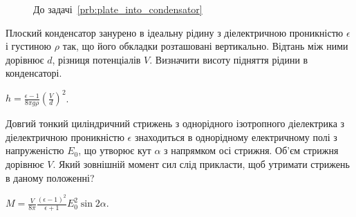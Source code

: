 \begin{figure}[h!]\centering
\caption{До задачі~\ref{prb:plate_into_condensator}}
\label{plate_into_condensator}
\end{figure}




\begin{problem}%
Плоский конденсатор занурено в ідеальну рідину з діелектричною проникністю $\epsilon$ і густиною $\rho$ так, що його обкладки розташовані вертикально. Відтань між ними дорівнює $d$, різниця потенціалів $V$. Визначити висоту підняття рідини в конденсаторі.
\begin{solution}
	$h = \frac{\epsilon - 1}{8\pi g \rho} \left(\frac{V}{d} \right)^2$.
\end{solution}
\end{problem}

\begin{problem}%
Довгий тонкий циліндричний стрижень з однорідного ізотропного діелектрика з діелектричною проникністю $\epsilon$ знаходиться в однорідному електричному полі з напруженістю $E_0$, що утворює кут $\alpha$ з напрямком осі стрижня. Об'єм стрижня дорівнює $V$. Який зовнішній момент сил слід прикласти, щоб утримати стрижень в даному положенні?
\begin{solution}
	$M = \frac{V}{8\pi} \frac{(\epsilon - 1)^2}{\epsilon + 1} E_0^2\sin2\alpha$.
\end{solution}
\end{problem}

